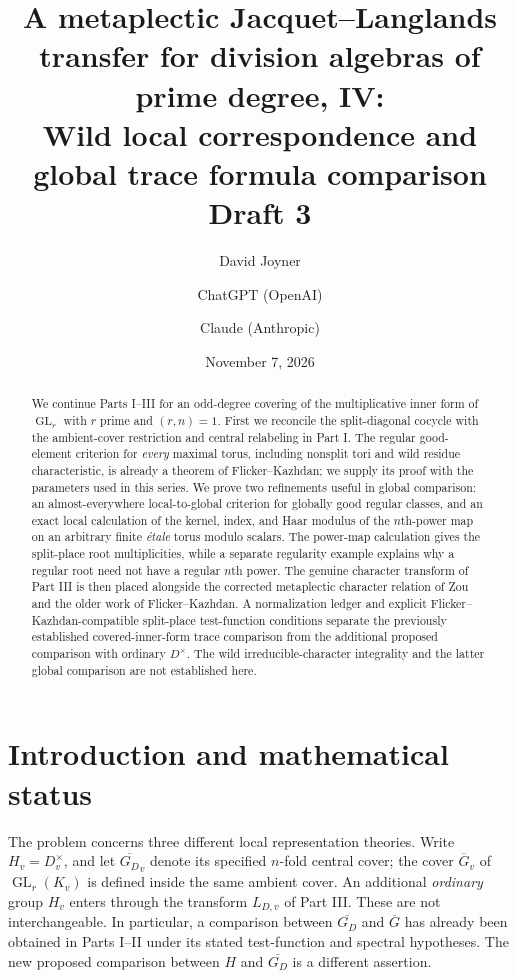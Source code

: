 \documentclass[11pt]{article}
\title{A metaplectic Jacquet--Langlands transfer for division algebras of prime degree, IV:\\
Wild local correspondence and global trace formula comparison\\[0.4em]\normalsize Draft 3}
\author{David Joyner \and ChatGPT (OpenAI) \and Claude (Anthropic)}
\date{November 7, 2026}
\newcommand{\GL}{\operatorname{GL}}
\newcommand{\Gb}{\overline G}
\newcommand{\GDb}{\overline{G_D}}
\theoremstyle{plain}
\theoremstyle{definition}
\begin{document}
\maketitle
\begin{abstract}
We continue Parts I--III for an odd-degree covering of the multiplicative
inner form of $\GL_r$ with $r$ prime and $(r,n)=1$.  First we reconcile the
split-diagonal cocycle with the ambient-cover restriction and central
relabeling in Part I.  The regular good-element criterion for \emph{every}
maximal torus, including nonsplit tori and wild residue characteristic,
is already a theorem of Flicker--Kazhdan; we supply its proof with the
parameters used in this series.  We prove two refinements useful in global
comparison: an almost-everywhere local-to-global criterion for globally
good regular classes, and an exact local calculation of the kernel, index,
and Haar modulus of the $n$th-power map on an arbitrary finite \emph{\'etale}
torus modulo scalars.  The power-map calculation gives the split-place
root multiplicities, while a separate regularity example explains why a
regular root need not have a regular $n$th power.  The genuine character transform of Part III
is then placed alongside the corrected metaplectic character relation of
Zou and the older work of Flicker--Kazhdan.  A normalization ledger and explicit Flicker--Kazhdan-compatible
split-place test-function conditions separate the previously established
covered-inner-form trace comparison from the additional proposed
comparison with ordinary $D^\times$.  The wild irreducible-character
integrality and the latter global comparison are not established here.
\end{abstract}
\tableofcontents

\section{Introduction and mathematical status}\label{sec:intro}
The problem concerns three different local representation theories.
Write $H_v=D_v^\times$, and let $\GDb_v$ denote its specified $n$-fold
central cover; the cover $\Gb_v$ of $\GL_r(K_v)$ is defined inside the
same ambient cover.  An additional \emph{ordinary} group $H_v$ enters
through the transform $L_{D,v}$ of Part III.  These are not interchangeable.
In particular, a comparison between $\GDb$ and $\Gb$ has already been
obtained in Parts I--II under its stated test-function and spectral
hypotheses.  The new proposed comparison between $H$ and $\GDb$ is a
different assertion.
\end{document}
